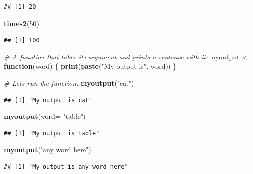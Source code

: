 \documentclass[
]{book}
\newenvironment{Shaded}{\begin{snugshade}}{\end{snugshade}}
\newcommand{\AttributeTok}[1]{\textcolor[rgb]{0.13,0.29,0.53}{#1}}
\newcommand{\CommentTok}[1]{\textcolor[rgb]{0.56,0.35,0.01}{\textit{#1}}}
\newcommand{\ControlFlowTok}[1]{\textcolor[rgb]{0.13,0.29,0.53}{\textbf{#1}}}
\newcommand{\DecValTok}[1]{\textcolor[rgb]{0.00,0.00,0.81}{#1}}
\newcommand{\FunctionTok}[1]{\textcolor[rgb]{0.13,0.29,0.53}{\textbf{#1}}}
\newcommand{\NormalTok}[1]{#1}
\newcommand{\OtherTok}[1]{\textcolor[rgb]{0.56,0.35,0.01}{#1}}
\newcommand{\StringTok}[1]{\textcolor[rgb]{0.31,0.60,0.02}{#1}}
\begin{document}
\begin{verbatim}
## [1] 20
\end{verbatim}

\begin{Shaded}
\begin{Highlighting}[]
\FunctionTok{times2}\NormalTok{(}\DecValTok{50}\NormalTok{)}
\end{Highlighting}
\end{Shaded}

\begin{verbatim}
## [1] 100
\end{verbatim}

\begin{Shaded}
\begin{Highlighting}[]
\CommentTok{\# A function that takes its argument and prints a sentence with it:}
\NormalTok{myoutput }\OtherTok{\textless{}{-}} \ControlFlowTok{function}\NormalTok{(word) \{}
  \FunctionTok{print}\NormalTok{(}\FunctionTok{paste}\NormalTok{(}\StringTok{"My output is"}\NormalTok{, word))}
\NormalTok{\}}

\CommentTok{\# Let\textquotesingle{}s run the function.}
\FunctionTok{myoutput}\NormalTok{(}\StringTok{"cat"}\NormalTok{)}
\end{Highlighting}
\end{Shaded}

\begin{verbatim}
## [1] "My output is cat"
\end{verbatim}

\begin{Shaded}
\begin{Highlighting}[]
\FunctionTok{myoutput}\NormalTok{(}\AttributeTok{word=} \StringTok{"table"}\NormalTok{)}
\end{Highlighting}
\end{Shaded}

\begin{verbatim}
## [1] "My output is table"
\end{verbatim}

\begin{Shaded}
\begin{Highlighting}[]
\FunctionTok{myoutput}\NormalTok{(}\StringTok{"any word here"}\NormalTok{)}
\end{Highlighting}
\end{Shaded}

\begin{verbatim}
## [1] "My output is any word here"
\end{verbatim}
\end{document}
